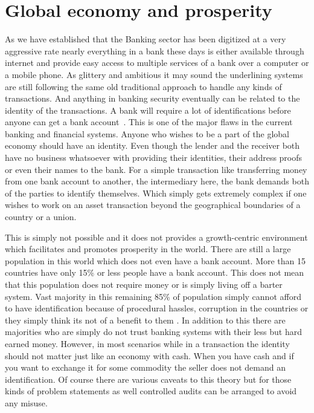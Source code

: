 \section{Global economy and prosperity}

As we have established that the Banking sector has been digitized at a
very aggressive rate nearly everything in a bank these days is either
available through internet and provide easy access to multiple
services of a bank over a computer or a mobile phone. As glittery and
ambitious it may sound the underlining systems are still following the
same old traditional approach to handle any kinds of transactions. And
anything in banking security eventually can be related to the identity
of the transactions. A bank will require a lot of identifications
before anyone can get a bank account~\cite{cocco14}. This is one of
the major flaws in the current banking and financial systems. Anyone
who wishes to be a part of the global economy should have an identity.
Even though the lender and the receiver both have no business
whatsoever with providing their identities, their address proofs or
even their names to the bank. For a simple transaction like
transferring money from one bank account to another, the intermediary
here, the bank demands both of the parties to identify themselves.
Which simply gets extremely complex if one wishes to work on an asset
transaction beyond the geographical boundaries of a country or a
union.

This is simply not possible and it does not provides a growth-centric
environment which facilitates and promotes prosperity in the world.
There are still a large population in this world which does not even
have a bank account. More than 15 countries have only 15\% or less
people have a bank account. This does not mean that this population
does not require money or is simply living off a barter system. Vast
majority in this remaining 85\% of population simply cannot afford to
have identification because of procedural hassles, corruption in the
countries or they simply think its not of a benefit to them
\cite{camilla15}. In addition to this there are majorities who are
simply do not trust banking systems with their less but hard earned
money. However, in most scenarios while in a transaction the identity
should not matter just like an economy with cash. When you have cash
and if you want to exchange it for some commodity the seller does not
demand an identification. Of course there are various caveats to this
theory but for those kinds of problem statements as well controlled
audits can be arranged to avoid any misuse.

